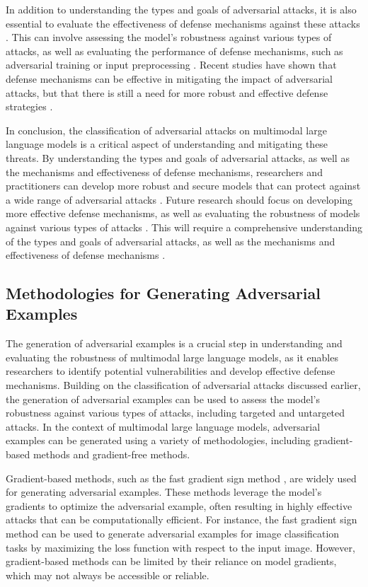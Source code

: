 \documentclass[11pt,a4paper]{article}
\begin{document}
In addition to understanding the types and goals of adversarial attacks, it is also essential to evaluate the effectiveness of defense mechanisms against these attacks \cite{arxiv:2408.15769}. This can involve assessing the model's robustness against various types of attacks, as well as evaluating the performance of defense mechanisms, such as adversarial training or input preprocessing \cite{arxiv:2309.00614}. Recent studies have shown that defense mechanisms can be effective in mitigating the impact of adversarial attacks, but that there is still a need for more robust and effective defense strategies \cite{arxiv:2401.13601}.

In conclusion, the classification of adversarial attacks on multimodal large language models is a critical aspect of understanding and mitigating these threats. By understanding the types and goals of adversarial attacks, as well as the mechanisms and effectiveness of defense mechanisms, researchers and practitioners can develop more robust and secure models that can protect against a wide range of adversarial attacks \cite{arxiv:2411.09259}. Future research should focus on developing more effective defense mechanisms, as well as evaluating the robustness of models against various types of attacks \cite{arxiv:2503.13962}. This will require a comprehensive understanding of the types and goals of adversarial attacks, as well as the mechanisms and effectiveness of defense mechanisms \cite{arxiv:2408.08632}.


\subsection{Methodologies for Generating Adversarial Examples}


The generation of adversarial examples is a crucial step in understanding and evaluating the robustness of multimodal large language models, as it enables researchers to identify potential vulnerabilities and develop effective defense mechanisms. Building on the classification of adversarial attacks discussed earlier, the generation of adversarial examples can be used to assess the model's robustness against various types of attacks, including targeted and untargeted attacks. In the context of multimodal large language models, adversarial examples can be generated using a variety of methodologies, including gradient-based methods and gradient-free methods.

Gradient-based methods, such as the fast gradient sign method \cite{doi:10.1109/tnnls.2025.3592935}, are widely used for generating adversarial examples. These methods leverage the model's gradients to optimize the adversarial example, often resulting in highly effective attacks that can be computationally efficient. For instance, the fast gradient sign method can be used to generate adversarial examples for image classification tasks by maximizing the loss function with respect to the input image. However, gradient-based methods can be limited by their reliance on model gradients, which may not always be accessible or reliable.
\end{document}
